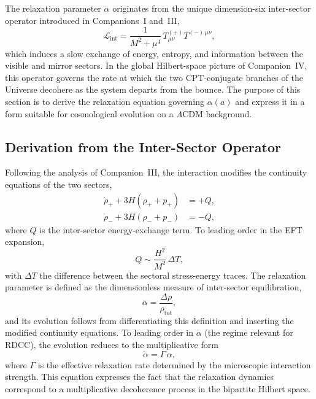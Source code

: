 \documentclass[11pt,a4paper]{article}
\begin{document}
The relaxation parameter $\alpha$ originates from the unique dimension-six inter-sector operator
introduced in Companions~I and~III,
\begin{equation}
    \mathcal{L}_{\mathrm{int}}
    = \frac{1}{M^2 + \mu^4}\,
      T^{(+)}_{\mu\nu} T^{(-)\,\mu\nu},
\end{equation}
which induces a slow exchange of energy, entropy, and information between the visible and
mirror sectors. In the global Hilbert-space picture of Companion~IV, this operator governs the
rate at which the two CPT-conjugate branches of the Universe decohere as the system departs
from the bounce. The purpose of this section is to derive the relaxation equation governing
$\alpha(a)$ and express it in a form suitable for cosmological evolution on a $\Lambda$CDM
background.

\subsection{Derivation from the Inter-Sector Operator}

Following the analysis of Companion~III, the interaction modifies the continuity equations of the
two sectors,
\begin{align}
    \dot{\rho}_+ + 3H(\rho_+ + p_+) &= +Q, \\
    \dot{\rho}_- + 3H(\rho_- + p_-) &= -Q,
\end{align}
where $Q$ is the inter-sector energy-exchange term. To leading order in the EFT expansion,
\begin{equation}
    Q \sim \frac{H^2}{M^2}\,\Delta T,
\end{equation}
with $\Delta T$ the difference between the sectoral stress-energy traces. The relaxation parameter
is defined as the dimensionless measure of inter-sector equilibration,
\begin{equation}
    \alpha = \frac{\Delta \rho}{\rho_{\mathrm{tot}}},
\end{equation}
and its evolution follows from differentiating this definition and inserting the modified continuity
equations. To leading order in $\alpha$ (the regime relevant for RDCC), the evolution reduces to
the multiplicative form
\begin{equation}
    \dot{\alpha} = \Gamma\,\alpha,
\end{equation}
where $\Gamma$ is the effective relaxation rate determined by the microscopic interaction
strength. This equation expresses the fact that the relaxation dynamics correspond to a
multiplicative decoherence process in the bipartite Hilbert space.
\end{document}
